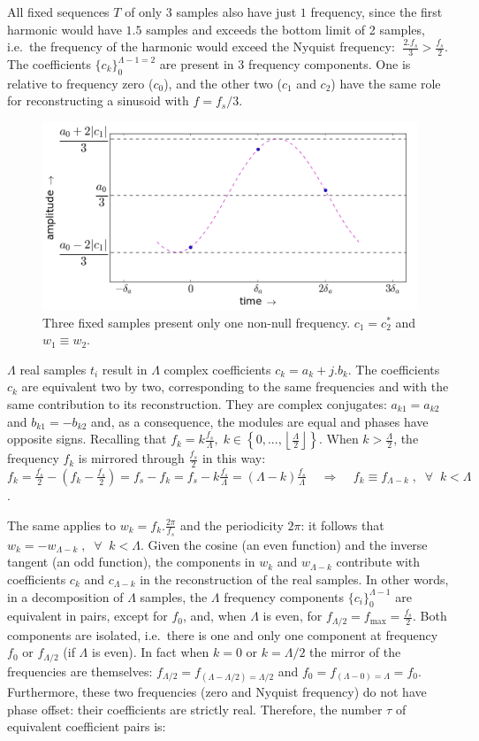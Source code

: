 All fixed sequences $T$ of only $3$ samples also have just $1$ frequency, since the first harmonic would have $1.5$ samples and exceeds the bottom limit of 2 samples, i.e.\ the frequency of the harmonic would exceed the Nyquist frequency:  $\; \frac{2. f_s}{3} > \frac{f_s}{2}$. 
The coefficients $\{c_k\}_0^{\Lambda-1=2}$ are present in 3 frequency components. One is relative to frequency zero ($c_0$), and the other two ($c_1$ and $c_2$) have the same role for reconstructing a sinusoid with $f=f_s/3$.

 \begin{figure}
     \centering
         \includegraphics[width=.7\textwidth]{figures/amostras3b_}
     \caption{Three fixed samples present only one non-null frequency. $c_1=c_2^*$ and $w_1 \equiv w_2$.}
         \label{fig:amostras3}
 \end{figure}

$\Lambda$ real samples $t_i$ result in $\Lambda$ complex coefficients $c_k=a_k+j.b_k$. The coefficients $c_k$ are equivalent two by two, corresponding to the same frequencies and with the same contribution to its reconstruction. They are complex conjugates: $a_{k1}=a_{k2}$ and $b_{k1}=-b_{k2}$ and, as a consequence, the modules are equal and phases have opposite signs. Recalling that $f_k = k\frac{f_s}{\Lambda}, \; k \in \left\{0, ..., \left \lfloor \frac{\Lambda}{2} \right \rfloor \right\} $. When $k > \frac{\Lambda}{2}$, the frequency $f_k$ is mirrored through $\frac{f_s}{2}$ in this way: $f_k=\frac{f_s}{2} - (f_k-\frac{f_s}{2})=f_s-f_k=f_s - k\frac{f_s}{\Lambda}=(\Lambda-k)\frac{f_s}{\Lambda} \;\;\;\; \Rightarrow \;\;\;\; f_k\equiv f_{\Lambda-k} \; ,\;\; \forall \;\; k<\Lambda$. 

The same applies to $w_k=f_k.\frac{2\pi}{f_s}$ and the periodicity $2\pi$: it follows that $w_k=-w_{\Lambda-k} \; ,\;\; \forall \;\; k<\Lambda$. Given the cosine (an even function) and the inverse tangent (an odd function), the components in $w_k$ and $w_{\Lambda-k}$ contribute with coefficients $c_k$ and $c_{\Lambda-k}$ in the reconstruction of the real samples. In other words, in a decomposition of $\Lambda$ samples, the $\Lambda$ frequency components $\{c_i\}_0^{\Lambda-1}$ are equivalent in pairs,
except for $f_0$, and, when $\Lambda$ is even, for $f_{\Lambda/2}=f_{\text{max}}=\frac{f_s}{2}$. Both components are isolated, i.e.\ there is one and only one component at frequency $f_0$ or $f_{\Lambda/2}$ (if $\Lambda$ is even). In fact when $k=0$ or $k=\Lambda/2$ the mirror of the frequencies are themselves: $f_{\Lambda/2}=f_{(\Lambda-\Lambda/2) = \Lambda/2}$ and $f_0=f_{(\Lambda-0)=\Lambda}=f_0$.
Furthermore, these two frequencies (zero and Nyquist frequency) do not have phase offset: their coefficients are strictly real. Therefore, the number $\tau$ of equivalent coefficient pairs is:

